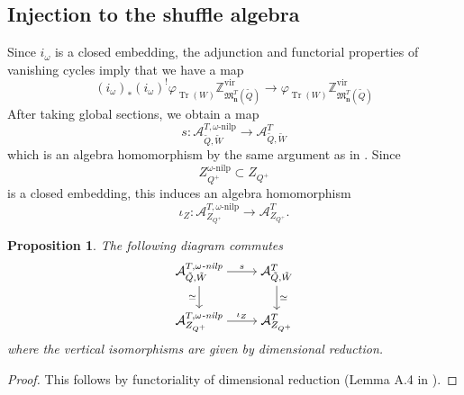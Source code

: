 \documentclass{amsart}
\newtheorem{proposition}[theorem]{Proposition}
\DeclareMathOperator{\Tr}{\mathrm{Tr}}
\def\vir{\mathrm{vir}}
\def\bn{{\boldsymbol{n}}}
\def\tQ{\tilde{Q}}
\def\tW{\tilde{W}}
\def\kha{\mathcal{A}^{T,\omega\text{-nilp}}_{\tQ,\tW}}
\begin{document}
\medskip

\subsection{Injection to the shuffle algebra}
\label{sub:injection}

Since $i_{\omega}$ is a closed embedding, the adjunction and functorial properties of vanishing cycles imply that we have a map
\[ 
(i_{\omega})_{*}(i_{\omega})^{!}\varphi_{\Tr(W)} \mathbb{Z}^{\vir}_{\mathfrak{M}_{\bn}^T(\tilde{Q})} \rightarrow \varphi_{\Tr(W)} \mathbb{Z}^{\vir}_{\mathfrak{M}_{\bn}^T(\tilde{Q})} 
\] 
After taking global sections, we obtain a map 
\begin{equation} \label{eqn: pushforward loop nilpotent}
s: \kha \rightarrow \mathcal{A}^{T}_{\tilde{Q},\tilde{W}}
\end{equation}
which is an algebra homomorphism by the same argument as in \cite[Proposition 6.1.13]{J}. Since 
\[ 
Z^{\omega\text{-nilp}}_{Q^{+}} \subset Z_{Q^{+}} 
\] 
is a closed embedding, this induces an algebra homomorphism 
\[ 
\iota_Z: \mathcal{A}^{T,\omega\text{-nilp}}_{Z_{Q^+}} \rightarrow \mathcal{A}^T_{Z_{Q^+}}. 
\] 

\medskip
 
\begin{proposition} \label{dimensionreduction1}
    The following diagram commutes \[\begin{tikzcd}[cramped]
	{\mathcal{A}^{T, \omega\emph{-nilp}}_{\tilde{Q},\tilde{W}}} & {\mathcal{A}^{T}_{\tilde{Q},\tilde{W}}} \\
	{\mathcal{A}^{T,\omega\emph{-nilp}}_{Z_{Q^+}}} & {\mathcal{A}^T_{Z_{Q^+}}}
	\arrow["s", from=1-1, to=1-2]
	\arrow["\simeq"', from=1-1, to=2-1]
	\arrow["{\simeq }", from=1-2, to=2-2]
	\arrow["{\iota_Z}", from=2-1, to=2-2]
\end{tikzcd}\]
where the vertical isomorphisms are given by dimensional reduction. 
\end{proposition}

\begin{proof} This follows by functoriality of dimensional reduction (Lemma A.4 in \cite{Yang_2019}). \end{proof}




\medskip
\end{document}
